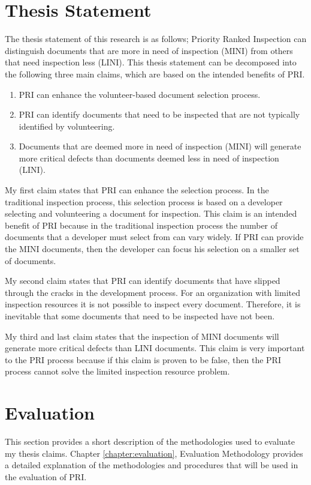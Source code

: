 \section{Thesis Statement}
The thesis statement of this research is as follows; Priority Ranked
Inspection can distinguish documents that are more in need of inspection
(MINI) from others that need inspection less (LINI). This thesis statement
can be decomposed into the following three main claims, which are based on
the intended benefits of PRI.

\begin{enumerate}
\item PRI can enhance the volunteer-based document selection process.
\item PRI can identify documents that need to be inspected that are not
  typically identified by volunteering.
\item Documents that are deemed more in need of inspection (MINI) will
  generate more critical defects than documents deemed less in need of
  inspection (LINI).
\end{enumerate}

My first claim states that PRI can enhance the selection process. In the
traditional inspection process, this selection process is based on a
developer selecting and volunteering a document for inspection.  This claim
is an intended benefit of PRI because in the traditional inspection process
the number of documents that a developer must select from can vary widely.
If PRI can provide the MINI documents, then the developer can focus his
selection on a smaller set of documents.

My second claim states that PRI can identify documents that have slipped
through the cracks in the development process. For an organization with
limited inspection resources it is not possible to inspect every document.
Therefore, it is inevitable that some documents that need to be inspected
have not been.

My third and last claim states that the inspection of MINI documents will
generate more critical defects than LINI documents. This claim is very
important to the PRI process because if this claim is proven to be false,
then the PRI process cannot solve the limited inspection resource problem.



\section{Evaluation}
This section provides a short description of the methodologies used to
evaluate my thesis claims. Chapter \ref{chapter:evaluation}, Evaluation
Methodology provides a detailed explanation of the methodologies and
procedures that will be used in the evaluation of PRI.


